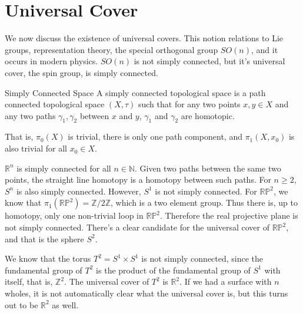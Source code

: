\documentclass{book}                                                           %
\begin{document}
        \section{Universal Cover}
            We now discuss the existence of universal covers.
            This notion relations to Lie groups, representation theory,
            the special orthogonal group $SO(n)$, and it occurs
            in modern physics. $SO(n)$ is not simply connected, but
            it's universal cover, the spin group, is simply
            connected.
            \begin{ldefinition}{Simply Connected Space}
                A simply connected topological space is a path
                connected topological space $(X,\tau)$ such that
                for any two points $x,y\in{X}$ and any two paths
                $\gamma_{1},\gamma_{2}$ between $x$ and $y$,
                $\gamma_{1}$ and $\gamma_{2}$ are homotopic.
            \end{ldefinition}
            That is, $\pi_{0}(X)$ is trivial, there is only one
            path component, and $\pi_{1}(X,x_{0})$ is also
            trivial for all $x_{0}\in{X}$.
            \begin{example}
                $\mathbb{R}^{n}$ is simply connected for all
                $n\in\mathbb{N}$. Given two paths between the same
                two points, the straight line homotopy is a homotopy
                between such paths. For $n\geq{2}$, $S^{n}$ is
                also simply connected. However, $S^{1}$ is not
                simply connected. For $\mathbb{RP}^{2}$, we know
                that $\pi_{1}(\mathbb{RP}^{2})=\mathbb{Z}/2\mathbb{Z}$,
                which is a two element group. Thus there is, up to
                homotopy, only one non-trivial loop in
                $\mathbb{RP}^{2}$. Therefore the real projective plane
                is not simply connected. There's a clear candidate for
                the universal cover of $\mathbb{RP}^{2}$, and that is
                the sphere $S^{2}$.
            \end{example}
            \begin{example}
                We know that the torus $T^{2}=S^{1}\times{S}^{1}$ is
                not simply connected, since the fundamental group of
                $T^{2}$ is the product of the fundamental group
                of $S^{1}$ with itself, that is, $\mathbb{Z}^{2}$. The
                universal cover of $T^{2}$ is $\mathbb{R}^{2}$. If
                we had a surface with $n$ wholes, it is not
                automatically clear what the universal cover is, but
                this turns out to be $\mathbb{R}^{2}$ as well.
            \end{example}
\end{document}
